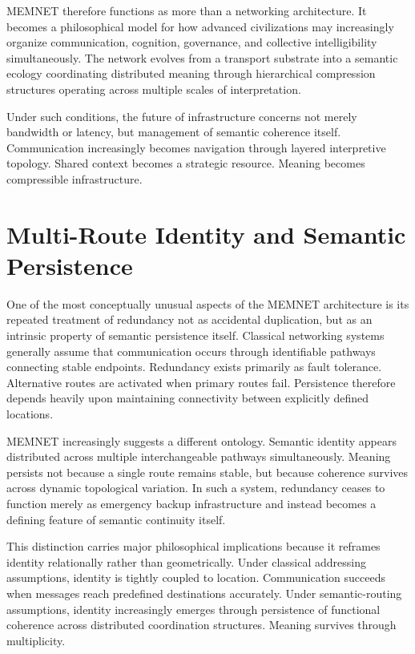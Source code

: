 \documentclass[11pt,a4paper]{article}
\begin{document}
MEMNET therefore functions as more than a networking architecture. It becomes a philosophical model for how advanced civilizations may increasingly organize communication, cognition, governance, and collective intelligibility simultaneously. The network evolves from a transport substrate into a semantic ecology coordinating distributed meaning through hierarchical compression structures operating across multiple scales of interpretation.

Under such conditions, the future of infrastructure concerns not merely bandwidth or latency, but management of semantic coherence itself. Communication increasingly becomes navigation through layered interpretive topology. Shared context becomes a strategic resource. Meaning becomes compressible infrastructure.

\section{Multi-Route Identity and Semantic Persistence}

One of the most conceptually unusual aspects of the MEMNET architecture is its repeated treatment of redundancy not as accidental duplication, but as an intrinsic property of semantic persistence itself. Classical networking systems generally assume that communication occurs through identifiable pathways connecting stable endpoints. Redundancy exists primarily as fault tolerance. Alternative routes are activated when primary routes fail. Persistence therefore depends heavily upon maintaining connectivity between explicitly defined locations.

MEMNET increasingly suggests a different ontology. Semantic identity appears distributed across multiple interchangeable pathways simultaneously. Meaning persists not because a single route remains stable, but because coherence survives across dynamic topological variation. In such a system, redundancy ceases to function merely as emergency backup infrastructure and instead becomes a defining feature of semantic continuity itself.

This distinction carries major philosophical implications because it reframes identity relationally rather than geometrically. Under classical addressing assumptions, identity is tightly coupled to location. Communication succeeds when messages reach predefined destinations accurately. Under semantic-routing assumptions, identity increasingly emerges through persistence of functional coherence across distributed coordination structures. Meaning survives through multiplicity.
\end{document}
